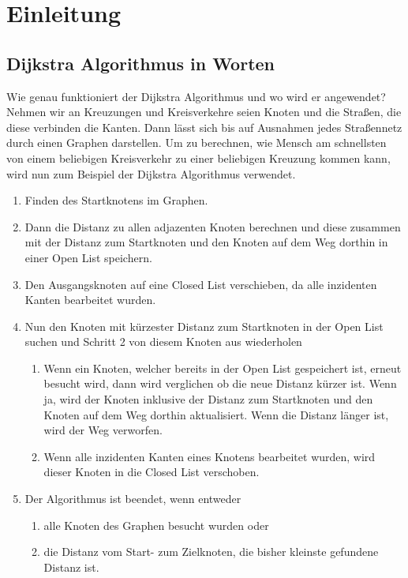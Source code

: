 \documentclass[a4paper]{article}
\begin{document}
	

\newpage

\section{Einleitung}

\subsection{Dijkstra Algorithmus in Worten}

Wie genau funktioniert der Dijkstra Algorithmus und wo wird er angewendet?
Nehmen wir an Kreuzungen und Kreisverkehre seien Knoten und die Straßen, die diese verbinden die Kanten. Dann lässt sich bis auf Ausnahmen jedes Straßennetz durch einen Graphen darstellen. Um zu berechnen, wie Mensch am schnellsten von einem beliebigen Kreisverkehr zu einer beliebigen Kreuzung kommen kann, wird nun zum Beispiel der Dijkstra Algorithmus verwendet.

\begin{enumerate}
    \item Finden des Startknotens im Graphen.
    \item Dann die Distanz zu allen adjazenten Knoten berechnen und diese zusammen mit der Distanz zum Startknoten und den Knoten auf dem Weg dorthin in einer Open List speichern. 
    \item Den Ausgangsknoten auf eine Closed List verschieben, da alle inzidenten Kanten bearbeitet wurden.
    
    \item Nun den Knoten mit kürzester Distanz zum Startknoten in der Open List suchen und Schritt 2 von diesem Knoten aus wiederholen
    \begin{enumerate}
        \item Wenn ein Knoten, welcher bereits in der Open List gespeichert ist, erneut besucht wird, dann wird verglichen ob die neue Distanz kürzer ist. Wenn ja, wird der Knoten inklusive der Distanz zum Startknoten und den Knoten auf dem Weg dorthin aktualisiert. Wenn die Distanz länger ist, wird der Weg verworfen.
        \item Wenn alle inzidenten Kanten eines Knotens bearbeitet wurden, wird dieser Knoten in die Closed List verschoben.
    \end{enumerate}

    \item Der Algorithmus ist beendet, wenn entweder
    \begin{enumerate}
        \item alle Knoten des Graphen besucht wurden oder
        \item die Distanz vom Start- zum Zielknoten, die bisher kleinste gefundene Distanz ist.
    \end{enumerate}
\end{enumerate}
\end{document}
